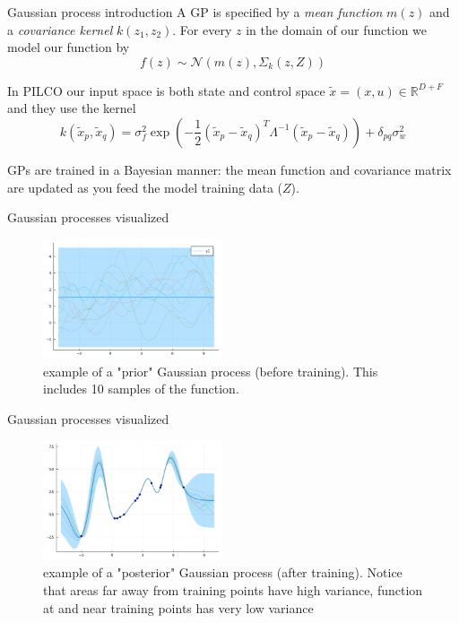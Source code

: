 \documentclass{beamer}
\begin{document}
\begin{frame}{Gaussian process introduction}
	A GP is specified by a \textit{mean function} $m(z)$ and a \textit{covariance kernel} $k(z_1, z_2)$. For every $z$ in the domain of our function we model our function by $$ f(z) \sim \mathcal{N}(m(z), \Sigma_k(z, Z)) $$
	
	In PILCO our input space is both state and control space $\tilde{x} = (x,u) \in \mathbb{R}^{D + F}$ and they use the kernel $$ k(\tilde{x}_p, \tilde{x}_q) = \sigma_f^2 \exp\left(-\frac{1}{2}(\tilde{x}_p - \tilde{x}_q)^T \Lambda^{-1} (\tilde{x}_p - \tilde{x}_q)\right) + \delta_{pq} \sigma_w^2 $$
	
	GPs are trained in a Bayesian manner: the mean function and covariance matrix are updated as you feed the model training data ($Z$).
	
\end{frame}
\begin{frame}{Gaussian processes visualized}
	\begin{figure}[h]
		\includegraphics[width=200px]{./gp1_prior.png}
		\caption{example of a "prior" Gaussian process (before training). This includes 10 samples of the function.}
	\end{figure}
\end{frame}
\begin{frame}{Gaussian processes visualized}
	\begin{figure}[h]
		\includegraphics[width=200px]{./gp1.png}
		\caption{example of a "posterior" Gaussian process (after training). Notice that areas far away from training points have high variance, function at and near training points has very low variance}
	\end{figure}
\end{frame}
\end{document}
